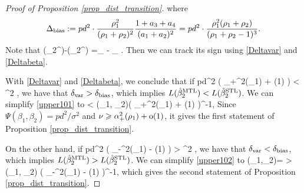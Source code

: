 \begin{proof}[Proof of Proposition \ref{prop_dist_transition}]
	where 
	$$\Delta_{\text{bias}}:=pd^2 \cdot \frac{\rho_1^2}{(\rho_1+\rho_2)^2}  \frac{1 + a_3 + a_4}{(a_1 + a_2)^2}= pd^2 \cdot \frac{\rho_1^2 (\rho_1+\rho_2)}{(\rho_1 + \rho_2 - 1)^3}.$$	
Note that 
 \be\label{var-beta}\te(\hat{\beta}_2^{\STL})-\te(\hat{\beta}_2^{\MTL}) =\delta_{\vari} - \delta_{\bias} .\ee
Then we can track its sign using \eqref{Deltavar} and \eqref{Deltabeta}.

 With \eqref{Deltavar} and \eqref{Deltabeta}, we conclude that if
\be\label{upper101}pd^2 \cdot {} \cdot \left( \al_+^2(\rho_1) +  \oo(1) \right) < \sigma^2  \cdot {},\ee
	we have that $\delta_{\text{var}} > \delta_{\text{bias}}$, which implies $L(\hat{\beta}_2^{\text{MTL}})<L(\hat{\beta}_2^{\text{STL}})$. We can simplify \eqref{upper101} to
	\be\label{pos1}    <   \Phi(\rho_1, \rho_2)\cdot \left( \al_+^2(\rho_1) +  \oo(1) \right)^{-1}, \ee
Since $ \Psi(\beta_1,\beta_2)=pd^2/\sigma^2$ and $\nu\geqslant \alpha_+^2(\rho_1) +  \operatorname{o}(1) $, it gives the first statement of Proposition \ref{prop_dist_transition}.	
 	
 On the other hand, if
\be\label{upper102}pd^2 \cdot {} \cdot \left( \al_-^2(\rho_1) -  \oo(1) \right) > \sigma^2  \cdot {},\ee
	we have that $\delta_{\text{var}} < \delta_{\text{bias}}$, which implies $L(\hat{\beta}_2^{\text{MTL}})>L(\hat{\beta}_2^{\text{STL}})$. We can simplify \eqref{upper102} to
	\be\label{neg1} \Psi(\beta_1,\beta_2)=  >  \Phi(\rho_1, \rho_2) \cdot \left( \al_-^2(\rho_1) -  \oo(1) \right)^{-1}, \ee
which gives the second statement of Proposition \ref{prop_dist_transition}.
\end{proof}




